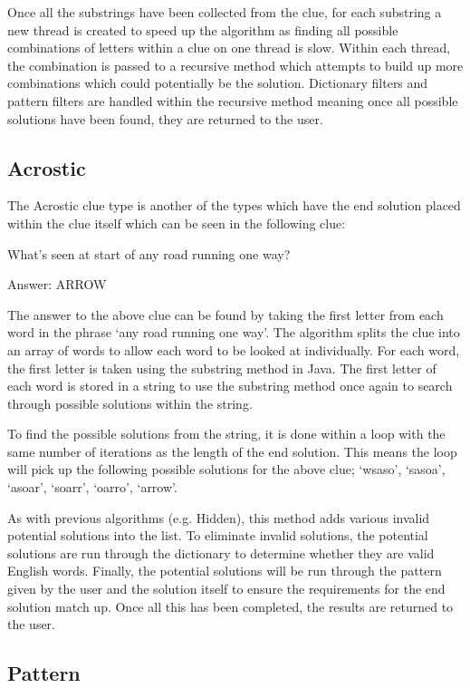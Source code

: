 Once all the substrings have been collected from the clue, for each substring 
a new thread is created to speed up the algorithm as finding all possible 
combinations of letters within a clue on one thread is slow. Within each thread, 
the combination is passed to a recursive method which attempts to build up 
more combinations which could potentially be the solution. Dictionary filters 
and pattern filters are handled within the recursive method meaning 
once all possible solutions have been found, they are returned to the user. 


\subsection{Acrostic}

The Acrostic clue type is another of the types which have the end solution
placed within  the clue itself which can be seen in the following clue:

What's seen at start of any road running one way?

Answer: ARROW

The answer to the above clue can be found by taking the first letter from each
word in  the phrase `any road running one way'. The algorithm splits the clue
into an array of words  to allow each word to be looked at individually. For
each word, the first letter is taken using the substring method in Java. The 
first letter of each word is stored in a string to use the substring method 
once again to search through possible solutions within the string.

To find the possible solutions from the string, it is done within a loop with the same number 
of iterations as the length of the end solution. This means the loop will pick up the 
following possible solutions for the above clue; `wsaso', `sasoa', `asoar', 
`soarr', `oarro', `arrow'.

As with previous algorithms (e.g. Hidden), this method adds various 
invalid potential solutions into the list. To eliminate invalid solutions, the 
potential solutions are run through the dictionary to determine whether 
they are valid English words. Finally, the potential solutions will be run through 
the pattern given by the user and the solution itself to ensure the 
requirements for the end solution match up. Once all this has been completed, 
the results are returned to the user. 

\subsection{Pattern}

